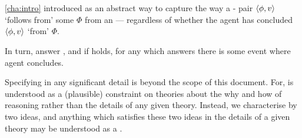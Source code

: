 \chapter{}
\label{cha:ros}


\begin{note}
  \autoref{cha:intro} introduced  as an abstract way to capture the way a - pair \(\langle\phi, v\rangle\) `follows from' some \pool{} \(\Phi\) from an \agpe{} --- regardless of whether the agent has concluded \(\langle\phi, v\rangle\) `from' \(\Phi\).

  In turn,  answer \qWhy{}, and if \issueInclusion{} holds, for any \ros{} which answers \qWhy{} there is some event where agent concludes.

  Specifying \ros{} in any significant detail is beyond the scope of this document.
  For, \issueInclusion{} is understood as a (plausible) constraint on theories about the why and how of reasoning rather than the details of any given theory.
  Instead, we characterise \ros{} by two ideas, and anything which satisfies these two ideas in the details of a given theory may be understood as a \ros{}.
\end{note}


\section{\supportI{}}
\label{cha:ros:I}


